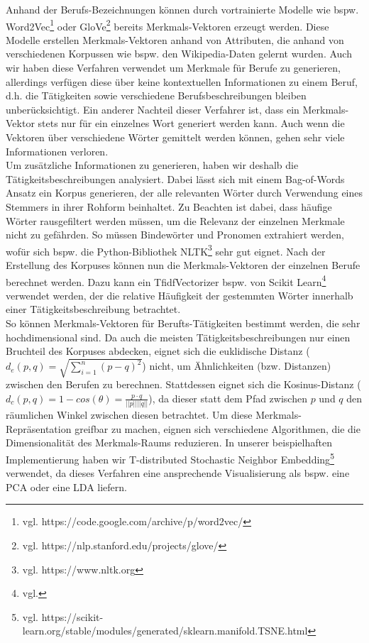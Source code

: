 \documentclass[10pt]{article}
\begin{document}
 Anhand der Berufs-Bezeichnungen können durch vortrainierte Modelle wie bspw.
 Word2Vec\footnote{vgl. https://code.google.com/archive/p/word2vec/} oder
 GloVe\footnote{vgl. https://nlp.stanford.edu/projects/glove/} bereits
 Merkmals-Vektoren erzeugt werden. Diese Modelle erstellen Merkmals-Vektoren
 anhand von Attributen, die anhand von verschiedenen Korpussen wie bspw. den
 Wikipedia-Daten gelernt wurden. Auch wir haben diese Verfahren verwendet um
 Merkmale für Berufe zu generieren, allerdings verfügen diese über keine
 kontextuellen Informationen zu einem Beruf, d.h. die Tätigkeiten sowie
 verschiedene Berufsbeschreibungen bleiben unberücksichtigt. Ein anderer
 Nachteil dieser Verfahrer ist, dass ein Merkmals-Vektor stets nur für ein
 einzelnes Wort generiert werden kann. Auch wenn die Vektoren über verschiedene
 Wörter gemittelt werden können, gehen sehr viele Informationen verloren.\\

Um zusätzliche Informationen zu generieren, haben wir deshalb die
Tätigkeitsbeschreibungen analysiert. Dabei lässt sich mit einem Bag-of-Words
Ansatz ein Korpus generieren, der alle relevanten Wörter durch Verwendung eines
Stemmers in ihrer Rohform beinhaltet. Zu Beachten ist dabei, dass häufige Wörter
rausgefiltert werden müssen, um die Relevanz der einzelnen Merkmale nicht zu
gefährden. So müssen Bindewörter und Pronomen extrahiert werden, wofür sich
bspw. die Python-Bibliothek NLTK\footnote{vgl. https://www.nltk.org} sehr gut
eignet. Nach der Erstellung des Korpuses können nun die Merkmals-Vektoren der
einzelnen Berufe berechnet werden. Dazu kann ein TfidfVectorizer bspw. von
Scikit Learn\footnote{vgl.} verwendet werden, der die relative Häufigkeit der
gestemmten Wörter innerhalb einer Tätigkeitsbeschreibung betrachtet.\\

So können Merkmals-Vektoren für Berufts-Tätigkeiten bestimmt werden, die sehr
hochdimensional sind. Da auch die meisten Tätigkeitsbeschreibungen nur einen
Bruchteil des Korpuses abdecken, eignet sich die euklidische Distanz ($d_e(p,q)
= \sqrt{\sum_{i=1}^n (p-q)^2}$) nicht, um Ähnlichkeiten (bzw. Distanzen)
zwischen den Berufen zu berechnen. Stattdessen eignet sich die Kosinus-Distanz
($d_c(p,q) = 1 - cos(\theta) = \frac{p \cdot q}{||p|| ||q||}$), da dieser statt
dem Pfad zwischen $p$ und $q$ den räumlichen Winkel zwischen diesen betrachtet.
Um diese Merkmals-Repräsentation greifbar zu machen, eignen sich verschiedene
Algorithmen, die die Dimensionalität des Merkmals-Raums reduzieren. In unserer
beispielhaften Implementierung haben wir T-distributed Stochastic Neighbor
Embedding\footnote{vgl.
https://scikit-learn.org/stable/modules/generated/sklearn.manifold.TSNE.html}
verwendet, da dieses Verfahren eine ansprechende Visualisierung als bspw. eine
PCA oder eine LDA liefern.\\
\end{document}
